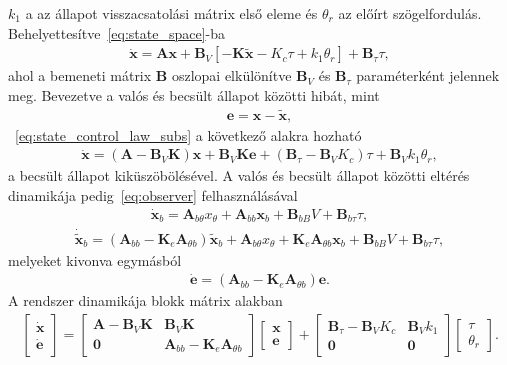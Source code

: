 $k_1$ a az állapot visszacsatolási mátrix első eleme és $\theta_r$ az előírt szögelfordulás.
Behelyettesítve~\eqref{eq:state_space}-ba
\begin{align}\label{eq:state_control_law_subs}
    \dot{\bm x} = \bm A \bm x + \bm B_V\left[-\bm K \tilde{\bm x} -K_c \tau + k_1 \theta_r\right] + \bm B_\tau \tau,
\end{align}
ahol a bemeneti mátrix $\bm B$ oszlopai elkülönítve $\bm B_V$ és $\bm B_\tau$ paraméterként jelennek meg.
Bevezetve a valós és becsült állapot közötti hibát, mint
\begin{align}
    \bm e = \bm x - \tilde{\bm x},
\end{align}
~\eqref{eq:state_control_law_subs} a következő alakra hozható
\begin{align}
    \dot{\bm x} = \left(\bm A - \bm B_V \bm K\right) \bm x + 
    \bm B_V \bm K \bm e + 
    \left(\bm B_\tau - \bm B_V K_c\right) \tau + 
    \bm B_V k_1 \theta_r,
\end{align}
a becsült állapot kiküszöbölésével. A valós és becsült állapot közötti eltérés dinamikája 
pedig~\eqref{eq:observer} felhasználásával
\begin{align}
    \dot{\bm x}_b = \bm A_{b\theta} x_\theta + \bm A_{bb} \bm x_b + 
    \bm B_{bB} V + \bm B_{b\tau} \tau,
\end{align}
\begin{align}
    \dot{\tilde{\bm x}}_b = \left(\bm A_{bb} - \bm K_e \bm A_{\theta b}\right) \tilde{\bm x}_b +
    \bm A_{b\theta} x_\theta +
    \bm K_e \bm A_{\theta b} \bm x_b +
    \bm B_{bB} V + \bm B_{b\tau} \tau,
\end{align}
melyeket kivonva egymásból
\begin{align}
    \dot{\bm e} = \left(\bm A_{bb} - \bm K_e \bm A_{\theta b}\right) \bm e.
\end{align}
A rendszer dinamikája blokk mátrix alakban
\begin{align}
    \begin{bmatrix}
        \dot{\bm x} \\
        \dot{\bm e}
    \end{bmatrix}
    =
    \begin{bmatrix}
        \bm A - \bm B_V \bm K & \bm B_V \bm K \\
        \bm 0 & \bm A_{bb} - \bm K_e \bm A_{\theta b}
    \end{bmatrix}
    \begin{bmatrix}
        \bm x \\
        \bm e
    \end{bmatrix}
    +
    \begin{bmatrix}
        \bm B_\tau - \bm B_V K_c & \bm B_V k_1\\
        \bm 0 & \bm 0
    \end{bmatrix}
    \begin{bmatrix}
        \tau \\
        \theta_r
    \end{bmatrix}.
\end{align}

